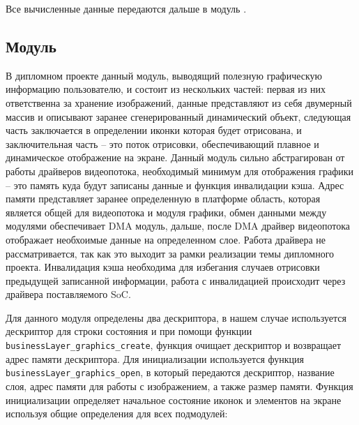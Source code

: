 Все вычисленные данные передаются дальше в модуль \moduleGraphics.

\subsection{Модуль \moduleGraphics}

В дипломном проекте данный модуль, выводящий полезную графическую информацию пользователю, и состоит из нескольких частей: первая из них ответственна за хранение
изображений, данные представляют из себя двумерный массив и описывают заранее сгенерированный динамический объект, следующая часть заключается в определении иконки
которая будет отрисована, и заключительная часть -- это поток отрисовки, обеспечивающий плавное и динамическое отображение на экране. Данный модуль
сильно абстрагирован от работы драйверов видеопотока, необходимый минимум для отображения графики -- это память куда будут записаны данные и функция инвалидации кэша.
Адрес памяти представляет заранее определенную в платформе область, которая является общей для видеопотока и модуля графики, обмен данными между модулями
обеспечивает DMA модуль, дальше, после DMA драйвер видеопотока отображает необхоимые данные на определенном слое. Работа драйвера не рассматривается, так как это выходит за рамки
реализации темы дипломного проекта. Инвалидация кэша необходима для избегания случаев отрисовки предыдущей записанной информации, работа с инвалидацией происходит через драйвера
поставляемого SoC.

Для данного модуля определены два дескриптора, в нашем случае используется дескриптор для строки состояния и при помощи функции \lstinline{businessLayer_graphics_create},
функция очищает дескриптор и возвращает адрес памяти дескриптора. Для инициализации используется функция \lstinline{businessLayer_graphics_open}, в который передаются дескриптор,
название слоя, адрес памяти для работы с изображением, а также размер памяти. Функция инициализации определяет начальное состояние иконок и элементов на экране используя
общие определения для всех подмодулей:

